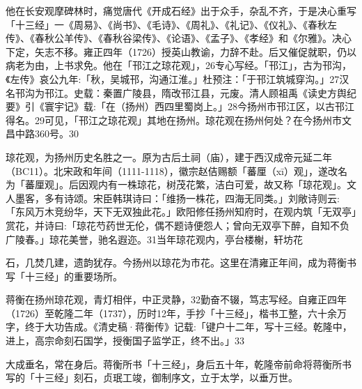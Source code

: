 他在长安观摩碑林时，痛觉唐代《开成石经》出于众手，杂乱不齐，于是决心重写「十三经」一《周易》、《尚书》、《毛诗》、《周礼》、《礼记》、《仪礼》、《春秋左传》、《春秋公羊传》、《春秋谷梁传》、《论语》、《孟子》、《孝经》和《尔雅》。决心下定，矢志不移。雍正四年（1726）授英山教谕，力辞不赴。后又催促就职，仍以病老为由，上书求免。他在「邗江之琼花观」，26专心写经。「邗江」，古为邗沟，《左传》哀公九年:「秋，吴城邗，沟通江淮。」杜预注：「于邗江筑城穿沟。」27汉名邗沟为邗江。史载：秦置广陵县，隋改邗江县，元废。清人顾祖禹《读史方舆纪要》引《寰宇记》载:「在（扬州）西四里蜀岗上。」28今扬州市邗江区，以古邗江得名。29可见，「邗江之琼花观」其地在扬州。琼花观在扬州何处？在今扬州市文昌中路360号。30

琼花观，为扬州历史名胜之一。原为古后土祠（庙），建于西汉成帝元延二年（BC11）。北宋政和年间（1111-1118），徽宗赵佶赐额「蕃厘（xī）观」，遂改名为「蕃厘观」。后因观内有一株琼花，树茂花繁，洁白可爱，故又称「琼花观」。文人墨客，多有诗颂。宋臣韩琪诗曰：「维扬一株花，四海无同类。」刘敞诗则云:「东风万木竞纷华，天下无双独此花。」欧阳修任扬州知府时，在观内筑「无双亭」赏花，并诗曰:「琼花芍药世无伦，偶不题诗便怨人；曾向无双亭下醉，自知不负广陵春。」琼花美誉，驰名遐迩。31当年琼花观内，亭台楼榭，轩坊花

\vfill
\begin{BookNotes}
\end{BookNotes}

\noindent 石，几焚几建，遗韵犹存。今扬州以琼花为市花。这里在清雍正年间，成为蒋衡书写「十三经」的重要场所。

蒋衡在扬州琼花观，青灯相伴，中正灵静，32勤奋不辍，笃志写经。自雍正四年（1726）至乾隆二年（1737），历时12年，手抄「十三经」，楷书工整，六十余万字，终于大功告成。《清史稿·蒋衡传》记载:「键户十二年，写十三经。乾隆中，进上，高宗命刻石国学，授衡国子监学正，终不出。」33

大成垂名，常在身后。蒋衡所书「十三经」，身后五十年，乾隆帝前命将蒋衡所书写的「十三经」刻石，贞珉工竣，御制序文，立于太学，以垂万世。

